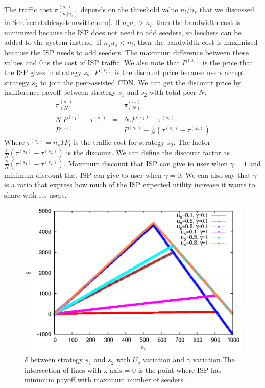 \documentclass[paper]{ieice}
\begin{document}
The traffic cost $\pi^{(s_1)}_{(n_l|n_s)}$ depends on the threshold
value $n_l/n_s$ that we discussed in
Sec.\ref{sec:stablesystemwithchurn}.  If $n_su_s > n_l$, then the
bandwidth cost is minimized because the ISP does not need to add seeders,
so leechers can be added to the system instead.  If $n_su_s < n_l$, then
the bandwidth cost is maximized because the ISP needs to add seeders.  The
maximum difference between these values and 0 is the cost of ISP
traffic.  We also note that $P^{(s_2)}$ is the price that the ISP gives in
strategy $s_2$.  $P^{(s_2)}$ is the discount price because users accept
strategy $s_2$ to join the peer-assisted CDN.  We can get the discount price
by indifference payoff between strategy $s_1$ and $s_2$ with total
peer $N$:
\begin{eqnarray}  
	\pi^{(s_1)}_{(N)} &=& \pi^{(s_2)}_{(N)}\\
	N.P^{(s_1)} - \tau^{(s_1)} &=& N.P^{(s_2)} - \tau^{(s_2)}\\
	P^{(s_2)} &=& P^{(s_1)} - \frac{1}{N} (\tau^{(s_1)} -  \tau^{(s_2)} ) 
\end{eqnarray}
Where $\tau^{(s_2)}=n_sTP_t$ is the traffic cost for strategy $s_2$.
The factor $\frac{1}{N} (\tau^{(s_1)} - \tau^{(s_2)} )$ is the
discount.  We can define the discount factor as $\frac{\gamma}{N}
(\tau^{(s_1)} - \tau^{(s_2)} )$.  Maximum discount that ISP can give
to user when $\gamma=1$ and minimum discount that ISP can give to user
when $\gamma=0$.  We can also say that $\gamma$ is a ratio that
express how much of the ISP expected utility increase it wants to
share with its users.

\begin{figure}[thb] 
\begin{center}
\includegraphics[scale=0.65]{graphs/plotpay.eps}
\end{center}
\caption{$\delta$ between strategy $s_1$ and $s_2$ with $U_s$ variation and $\gamma$ variation.The intersection of lines with x-axis = 0 is the point where ISP has minimum payoff with maximum number of seeders. }
\label{fig:delta}
\vspace{-2mm}
 \end{figure}
 
\end{document}
